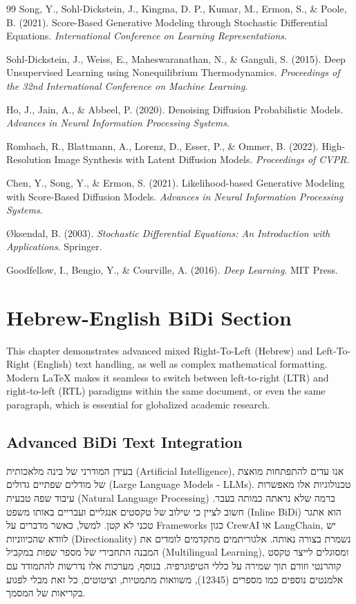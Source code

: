\documentclass[a4paper,12pt,oneside]{memoir}
\begin{document}
\begin{thebibliography}{99}
Song, Y., Sohl-Dickstein, J., Kingma, D. P., Kumar, M., Ermon, S., \& Poole, B. (2021). Score-Based Generative Modeling through Stochastic Differential Equations. \textit{International Conference on Learning Representations}.

Sohl-Dickstein, J., Weiss, E., Maheswaranathan, N., \& Ganguli, S. (2015). Deep Unsupervised Learning using Nonequilibrium Thermodynamics. \textit{Proceedings of the 32nd International Conference on Machine Learning}.

Ho, J., Jain, A., \& Abbeel, P. (2020). Denoising Diffusion Probabilistic Models. \textit{Advances in Neural Information Processing Systems}.

Rombach, R., Blattmann, A., Lorenz, D., Esser, P., \& Ommer, B. (2022). High-Resolution Image Synthesis with Latent Diffusion Models. \textit{Proceedings of CVPR}.

Chen, Y., Song, Y., \& Ermon, S. (2021). Likelihood-based Generative Modeling with Score-Based Diffusion Models. \textit{Advances in Neural Information Processing Systems}.

Øksendal, B. (2003). \textit{Stochastic Differential Equations: An Introduction with Applications}. Springer.

Goodfellow, I., Bengio, Y., \& Courville, A. (2016). \textit{Deep Learning}. MIT Press.
\end{thebibliography}

\chapter{Hebrew-English BiDi Section}
This chapter demonstrates advanced mixed Right-To-Left (Hebrew) and Left-To-Right (English) text handling, as well as complex mathematical formatting. Modern LaTeX makes it seamless to switch between left-to-right (LTR) and right-to-left (RTL) paradigms within the same document, or even the same paragraph, which is essential for globalized academic research.

\section{Advanced BiDi Text Integration}
\begin{hebrew}
בעידן המודרני של בינה מלאכותית (Artificial Intelligence), אנו עדים להתפתחות מואצת של מודלים שפתיים גדולים (Large Language Models - LLMs). טכנולוגיות אלו מאפשרות עיבוד שפה טבעית (Natural Language Processing) ברמה שלא נראתה כמותה בעבר. חשוב לציין כי שילוב של טקסטים אנגליים ועבריים באותו משפט (Inline BiDi) הוא אתגר טכני לא קטן. למשל, כאשר מדברים על Frameworks כגון CrewAI או LangChain, יש לוודא שהכיווניות (Directionality) נשמרת בצורה נאותה. אלגוריתמים מתקדמים לומדים את המבנה התחבירי של מספר שפות במקביל (Multilingual Learning), ומסוגלים לייצר טקסט קוהרנטי וזורם תוך שמירה על כללי הטיפוגרפיה. בנוסף, מערכות אלו נדרשות להתמודד עם אלמנטים נוספים כמו מספרים (12345), משוואות מתמטיות, וציטוטים, כל זאת מבלי לפגוע בקריאות של המסמך.
\end{hebrew}
\end{document}
